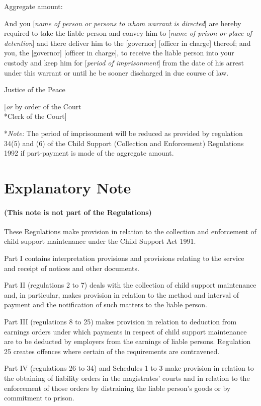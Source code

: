\documentclass[a4paper]{article}
\newcommand{\parthead}{}
\begin{document}
\medskip

Aggregate amount:

\medskip

And you [\emph{name of person or persons to whom warrant is directed}] are hereby required to take the liable person and convey him to [\emph{name of prison or place of detention}] and there deliver him to the [governor] [officer in charge] thereof; and you, the [governor] [officer in charge], to receive the liable person into your custody and keep him for [\emph{period of imprisonment}] from the date of his arrest under this warrant or until he be sooner discharged in due course of law.

\medskip

{\raggedleft Justice of the Peace

\medskip

[\emph{or} by order of the Court\\*Clerk of the Court]

}

\medskip

*\emph{Note:} The period of imprisonment will be reduced as provided by regulation 34(5) and (6) of the Child Support (Collection and Enforcement) Regulations 1992 if part-payment is made of the aggregate amount.


\part{Explanatory Note}

\renewcommand\parthead{--- Explanatory Note}

\subsection*{(This note is not part of the Regulations)}

 These Regulations make provision in relation to the collection and enforcement of child support maintenance under the Child Support Act 1991.

  Part I contains interpretation provisions and provisions relating to the service and receipt of notices and other documents.

  Part II (regulations 2 to 7) deals with the collection of child support maintenance and, in particular, makes provision in relation to the method and interval of payment and the notification of such matters to the liable person.

  Part III (regulations 8 to 25) makes provision in relation to deduction from earnings orders under which payments in respect of child support maintenance are to be deducted by employers from the earnings of liable persons. Regulation 25 creates offences where certain of the requirements are contravened.

  Part IV (regulations 26 to 34) and Schedules 1 to 3 make provision in relation to the obtaining of liability orders in the magistrates' courts and in relation to the enforcement of those orders by distraining the liable person’s goods or by commitment to prison.
\end{document}
